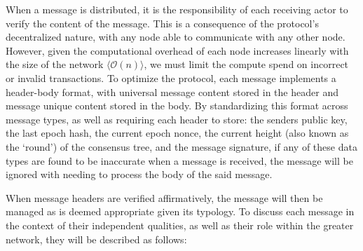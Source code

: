 When a message is distributed, it is the responsibility of each receiving actor to verify the content of the message. This is a consequence of the protocol's decentralized nature, with any node able to communicate with any other node. However, given the computational overhead of each node increases linearly with the size of the network \(\langle \mathcal{O}(n)\rangle\), we must limit the compute spend on incorrect or invalid transactions. To optimize the protocol, each message implements a header-body format, with universal message content stored in the header and message unique content stored in the body. By standardizing this format across message types, as well as requiring each header to store: the senders public key, the last epoch hash, the current epoch nonce, the current height (also known as the ‘round’) of the consensus tree, and the message signature, if any of these data types are found to be inaccurate when a message is received, the message will be ignored with needing to process the body of the said message.

When message headers are verified affirmatively, the message will then be managed as is deemed appropriate given its typology. To discuss each message in the context of their independent qualities, as well as their role within the greater network, they will be described as follows:

